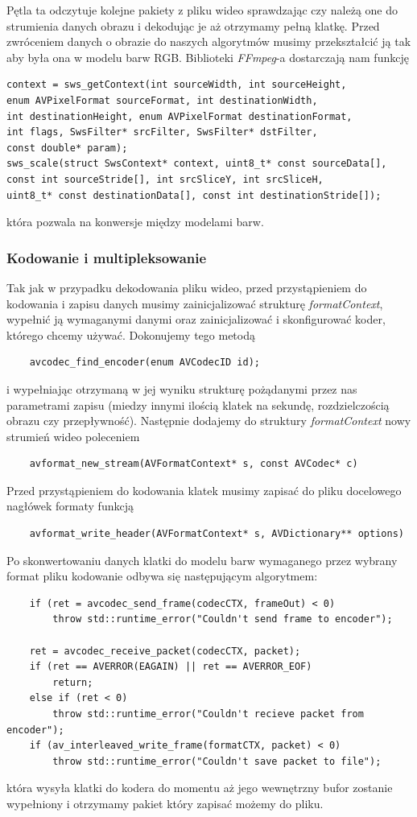 \documentclass[twoside]{projektInzynierskiMS}
\begin{document}
Pętla ta odczytuje kolejne pakiety z pliku wideo sprawdzając czy należą one do strumienia danych obrazu i dekodując je aż otrzymamy pełną klatkę. Przed zwróceniem danych o obrazie do naszych algorytmów musimy przekształcić ją tak aby była ona w modelu barw RGB. Biblioteki \emph{FFmpeg}-a dostarczają nam funkcję
\begin{verbatim}
context = sws_getContext(int sourceWidth, int sourceHeight, 
enum AVPixelFormat sourceFormat, int destinationWidth, 
int destinationHeight, enum AVPixelFormat destinationFormat, 
int flags, SwsFilter* srcFilter, SwsFilter* dstFilter, 
const double* param);
sws_scale(struct SwsContext* context, uint8_t* const sourceData[], 
const int sourceStride[], int srcSliceY, int srcSliceH, 
uint8_t* const destinationData[], const int destinationStride[]);
\end{verbatim}
która pozwala na konwersje między modelami barw.
\subsubsection{Kodowanie i multipleksowanie}
Tak jak w przypadku dekodowania pliku wideo, przed przystąpieniem do kodowania i zapisu danych musimy zainicjalizować strukturę \emph{formatContext}, wypełnić ją wymaganymi danymi oraz zainicjalizować i skonfigurować koder, którego chcemy używać. Dokonujemy tego metodą
\begin{verbatim}
	avcodec_find_encoder(enum AVCodecID id);
\end{verbatim}
i wypełniając otrzymaną w jej wyniku strukturę pożądanymi przez nas parametrami zapisu (miedzy innymi ilością klatek na sekundę, rozdzielczością obrazu czy przepływność). Następnie dodajemy do struktury \emph{formatContext} nowy strumień wideo poleceniem 
\begin{verbatim}
	avformat_new_stream(AVFormatContext* s, const AVCodec* c) 	
\end{verbatim}
Przed przystąpieniem do kodowania klatek musimy zapisać do pliku docelowego nagłówek formaty funkcją
\begin{verbatim}
	avformat_write_header(AVFormatContext* s, AVDictionary** options) 	
\end{verbatim}
Po skonwertowaniu danych klatki do modelu barw wymaganego przez wybrany format pliku kodowanie odbywa się następującym algorytmem: 
\begin{verbatim}
	if (ret = avcodec_send_frame(codecCTX, frameOut) < 0)
	    throw std::runtime_error("Couldn't send frame to encoder");
	
	ret = avcodec_receive_packet(codecCTX, packet);
	if (ret == AVERROR(EAGAIN) || ret == AVERROR_EOF)
	    return;
	else if (ret < 0)
	    throw std::runtime_error("Couldn't recieve packet from encoder");
	if (av_interleaved_write_frame(formatCTX, packet) < 0)
	    throw std::runtime_error("Couldn't save packet to file");
\end{verbatim}
która wysyła klatki do kodera do momentu aż jego wewnętrzny bufor zostanie wypełniony i otrzymamy pakiet który zapisać możemy do pliku.
\end{document}
